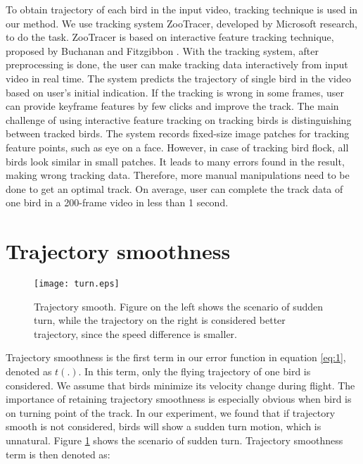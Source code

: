 To obtain trajectory of each bird in the input video, tracking technique is used in our method. We use tracking system ZooTracer\cite{ZooTracer}, developed by Microsoft research, to do the task. ZooTracer is based on interactive feature tracking technique, proposed by Buchanan and Fitzgibbon \cite{Tracking}. With the tracking system, after preprocessing is done, the user can make tracking data interactively from input video in real time. The system predicts the trajectory of single bird in the video based on user's initial indication. If the tracking is wrong in some frames, user can provide keyframe features by few clicks and improve the track.
The main challenge of using interactive feature tracking on tracking birds is distinguishing between tracked birds. The system records fixed-size image patches for tracking feature points, such as eye on a face. However, in case of tracking bird flock, all birds look similar in small patches. It leads to many errors found in the result, making wrong tracking data. Therefore, more manual manipulations need to be done to get an optimal track. On average, user can complete the track data of one bird in a 200-frame video in less than 1 second.



\section{Trajectory smoothness}


\begin{figure}[h]
 \begin{center}
  \texttt{[image: turn.eps]}
 \end{center}
 \caption{Trajectory smooth. Figure on the left shows the scenario of sudden turn, while the trajectory on the right is considered better trajectory, since the speed difference is smaller.}
 \label{figure:turn}
\end{figure}



Trajectory smoothness is the first term in our error function in equation \ref{eq:1}, denoted as $t(.)$. In this term, only the flying trajectory of one bird is considered. We assume that birds minimize its velocity change during flight. The importance of retaining trajectory smoothness is especially obvious when bird is on turning point of the track. In our experiment, we found that if trajectory smooth is not considered, birds will show a sudden turn motion, which is unnatural. Figure \ref{figure:turn} shows the scenario of sudden turn. Trajectory smoothness term is then denoted as:

